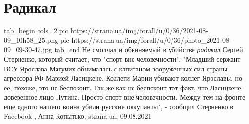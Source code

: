  
 
 
 
 
\chapter{Радикал}
\label{sec:slova.radikal}

\ifcmt
  tab_begin cols=2
     pic https://strana.ua/img/forall/u/0/36/2021-08-09_10h58_25.png
     pic https://strana.ua/img/forall/u/0/36/photo_2021-08-09_09-30-47.jpg
  tab_end
\fi
Не смолчал и обвиняемый в убийстве \emph{радикал} Сергей Стерненко, который считает,
что "спорт вне человечности".  "Младший сержант ВСУ Ярослава Магучих обнималась
с капитаном вооруженных сил страны-агрессора РФ Марией Ласицкене.  Коллеги
Марии убивают коллег Ярославы, но ее, похоже, это не беспокоит.  Так же как не
беспокоит тот факт, что Ласицкене - доверенное лицо Путина.  Просто спорт вне
человечности.  Между тем на фронте еще одного нашего воина убили русские
оккупанты", - сообщил Стерненко в Facebook
, 
Анна Копытько, strana.ua, 09.08.2021
